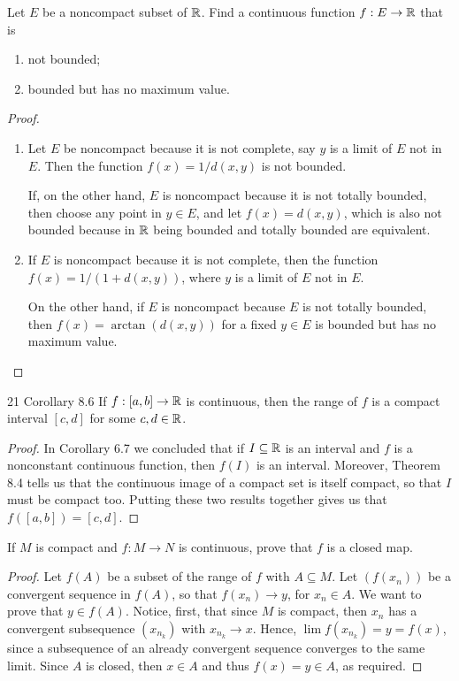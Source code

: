 \begin{exercise}{20}
Let $E$ be a noncompact subset of $\mathbb{R}$.
Find a continuous function $f:E\to\mathbb{R}$ that is 
\begin{enumerate}
    \item not bounded;
    \item bounded but has no maximum value.
\end{enumerate}
\end{exercise}
\begin{proof}
\begin{enumerate}
    \item Let $E$ be noncompact because it is not complete, say $y$ is a limit of $E$ not in $E$.
    Then the function $f(x)=1/d(x,y)$ is not bounded.

    If, on the other hand, $E$ is noncompact because it is not totally bounded, then choose any point in $y\in E$, and let $f(x)=d(x,y)$, which is also not bounded because in $\mathbb{R}$ being bounded and totally bounded are equivalent.
    \item If $E$ is noncompact because it is not complete, then the function $f(x)=1/(1+d(x,y))$, where $y$ is a limit of $E$ not in $E$.

    On the other hand, if $E$ is noncompact because $E$ is not totally bounded, then $f(x)=\arctan(d(x,y))$ for a fixed $y\in E$ is bounded but has no maximum value.
\end{enumerate}
\end{proof} 

\begin{exercise}{21 Corollary 8.6}
If $f:[a,b]\to\mathbb{R}$ is continuous, then the range of $f$ is a compact interval $[c,d]$ for some $c,d\in\mathbb{R}$.
\end{exercise}
\begin{proof}
In Corollary 6.7 we concluded that if $I\subseteq\mathbb{R}$ is an interval and $f$ is a nonconstant continuous function, then $f(I)$ is an interval. 
Moreover, Theorem 8.4 tells us that the continuous image of a compact set is itself compact, so that $I$ must be compact too.
Putting these two results together gives us that $f([a,b])=[c,d]$.
\end{proof} 

\begin{exercise}{22}
If $M$ is compact and $f:M\to N$ is continuous, prove that $f$ is a closed map.
\end{exercise}
\begin{proof}
Let $f(A)$ be a subset of the range of $f$ with $A\subseteq M$.
Let $(f(x_n))$ be a convergent sequence in $f(A)$, so that $f(x_n)\to y$, for $x_n\in A$.
We want to prove that $y\in f(A)$.
Notice, first, that since $M$ is compact, then $x_n$ has a convergent subsequence $(x_{n_k})$ with $x_{n_k}\to x$.
Hence, $\lim f(x_{n_k}) = y = f(x)$, since a subsequence of an already convergent sequence converges to the same limit.
Since $A$ is closed, then $x\in A$ and thus $f(x)=y\in A$, as required.
\end{proof} 

